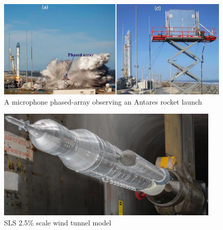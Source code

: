 \documentclass[]{aiaa-tc}%
\begin{document}
\begin{figure}[htb]
\begin{center}
\includegraphics[width=1\textwidth]{Images/MicrophonePhasedArray.png}
\caption{A microphone phased-array observing an Antares rocket launch \cite{MicrophonePhasedArray}}
\label{MicrophoneArrayPic}
\end{center}
\end{figure}

\begin{figure}[htb]
\begin{center}
\includegraphics[width=0.95\textwidth]{Images/SLS_WTT_MPCV.png}
\caption{SLS 2.5\% scale wind tunnel model \cite{SLSAscentWTT}}
\label{SLSWTT}
\end{center}
\end{figure}
\end{document}
